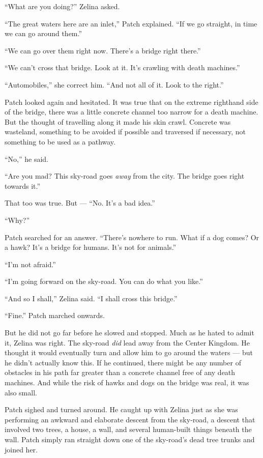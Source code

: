 \documentclass[ebook,oneside,openany,17pt]{memoir}
\newenvironment{tolerant}[1]{%
  \par\tolerance=#1\relax
}{%
  \par
}
\begin{document}
“What are you doing?” Zelina asked.

“The great waters here are an inlet,” Patch explained. “If we go
straight, in time we can go around them.”

“We can go over them right now. There’s a bridge right there.”

“We can’t cross that bridge. Look at it. It’s crawling with death
machines.”

“Automobiles,” she correct him. “And not all of it. Look to the
right.”

Patch looked again and hesitated. It was true that on the extreme
righthand side of the bridge, there was a little concrete channel too
narrow for a death machine. But the thought of travelling along it
made his skin crawl. Concrete was wasteland, something to be avoided
if possible and traversed if necessary, not something to be used as a
pathway.

“No,” he said.

“Are you mad? This sky-road goes \emph{away} from the city. The
bridge goes right towards it.”

That too was true. But — “No. It’s a bad idea.”

“Why?”

Patch searched for an answer. “There’s nowhere to run. What if a dog
comes? Or a hawk? It’s a bridge for humans. It’s not for animals.”

“I’m not afraid.”

“I’m going forward on the sky-road. You can do what you like.”

“And so I shall,” Zelina said. “I shall cross this bridge.”

“Fine.” Patch marched onwards.

\begin{tolerant}{500}
But he did not go far before he slowed and stop\-ped. Much as he hated
to admit it, Zelina was right. The sky-road \emph{did} lead away
from the Center Kingdom. He thought it would eventually turn and allow
him to go around the waters — but he didn’t actually know this. If he
continued, there might be any number of obstacles in his path far
greater than a concrete channel free of any death machines. And while
the risk of hawks and dogs on the bridge was real, it was also small.
\end{tolerant}

Patch sighed and turned around. He caught up with Zelina just as she
was performing an awkward and elaborate descent from the sky-road, a
descent that involved two trees, a house, a wall, and several
human-built things beneath the wall. Patch simply ran straight down
one of the sky-road’s dead tree trunks and joined her.
\end{document}
